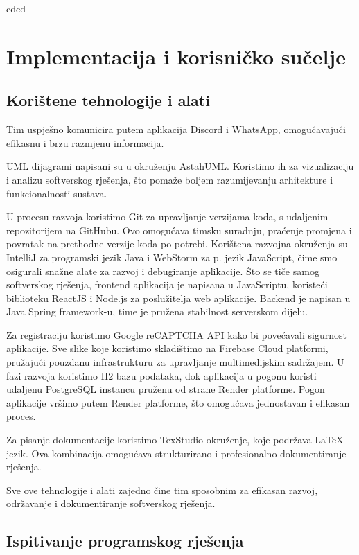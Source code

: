 cdcd \chapter{Implementacija i korisničko sučelje}
		
		
		\section{Korištene tehnologije i alati}
			
			Tim uspješno komunicira putem aplikacija Discord i WhatsApp, omogućavajući efikasnu i brzu razmjenu informacija. 
			
			UML dijagrami napisani su u okruženju AstahUML. Koristimo ih za vizualizaciju i analizu softverskog rješenja, što pomaže boljem razumijevanju arhitekture i funkcionalnosti sustava.
			
			U procesu razvoja koristimo Git za upravljanje verzijama koda, s udaljenim repozitorijem na GitHubu. Ovo omogućava timsku suradnju, praćenje promjena i povratak na prethodne verzije koda po potrebi. Korištena razvojna okruženja su IntelliJ za programski jezik Java i WebStorm za p. jezik JavaScript, čime smo osigurali snažne alate za razvoj i debugiranje aplikacije. Što se tiče samog softverskog rješenja, frontend aplikacija je napisana u JavaScriptu, koristeći biblioteku ReactJS i Node.js za poslužitelja web aplikacije. Backend je napisan u Java Spring framework-u, time je pružena stabilnost serverskom dijelu.
			
			Za registraciju koristimo Google reCAPTCHA API kako bi povećavali sigurnost aplikacije. Sve slike koje koristimo skladištimo na Firebase Cloud platformi, pružajući pouzdanu infrastrukturu za upravljanje multimedijskim sadržajem. 
			U fazi razvoja koristimo H2 bazu podataka, dok aplikacija u pogonu koristi udaljenu PostgreSQL instancu pruženu od strane Render platforme. Pogon aplikacije vršimo putem Render platforme, što omogućava jednostavan i efikasan proces.
			
			Za pisanje dokumentacije koristimo TexStudio okruženje, koje podržava LaTeX jezik. Ova kombinacija omogućava strukturirano i profesionalno dokumentiranje rješenja. 
			
			Sve ove tehnologije i alati zajedno čine tim sposobnim za efikasan razvoj, održavanje i dokumentiranje softverskog rješenja.
			
			\eject 
		
	
		\section{Ispitivanje programskog rješenja}
			

